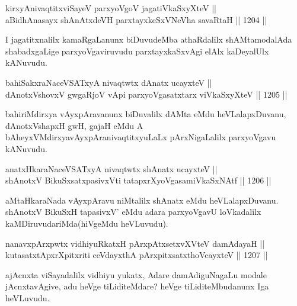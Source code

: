 \begin{shl}
kirxyAnivaqtitxviSayeV parxyoVgoV jagatiVkaSxyXteV || \\
aBidhAnasayx shAnAtxdeVH parxtayxkeSxVNeVha savaRtaH \hfill || 1204 ||  
\end{shl}

\begin{artha}
I jagatitxnalilx kamaRgaLanunx biDuvudeMba athaRdalilx shAMtamodalAda shabadxgaLige parxyoVgaviruvudu parxtayxkaSxvAgi elAlx kaDeyalUlx kANuvudu.
\end{artha}


\begin{shl}
bahiSakxraNaceVSATxyA nivaqtwtx dAnatx ucayxteV || \\
dAnotxV\s shovxV gwgaRjoV vA\s pi parxyoVgasatxtarx viVkaSxyXteV \hfill || 1205 ||  
\end{shl}

\begin{artha}
bahiriMdirxya vAyxpAravanunx biDuvalilx dAMta eMdu heVLalapxDuvanu, dAnotxV\s shapxH gwH, gajaH eMdu A bAheyxVMdirxyavAyxpAranivaqtitxyuLaLx pArxNigaLalilx parxyoVgavu kANuvudu.
\end{artha}


\begin{shl}
anatxHkaraNaceVSATxyA nivaqtwtx shAnatx ucayxteV || \\
shAnotxV BikuSxsatxpasivxVti tatapxrXyoVgasamiVkaSxNAtf \hfill || 1206 ||  
\end{shl}

\begin{artha}
aMtaHkaraNada vAyxpAravu niMtalilx shAnatx eMdu heVLalapxDuvanu. shAnotxV BikuSxH tapasivxV' eMdu adara parxyoVgavU loVkadalilx kaMDiruvudariMda(hiVgeMdu heVLuvudu).
\end{artha}


\begin{shl}
nanavxpArxpwtx vidhiyuRkatxH pArxpAtxsetxvXVteV damAdayaH || \\
kutasatxtApxrXpitxriti ceVdayxthA pArxpitxsatxthoVcayxteV \hfill || 1207 ||  
\end{shl}

\begin{artha}
ajAcnxta viSayadalilx vidhiyu yukatx, Adare damAdiguNagaLu modale jAcnxtavAgive, adu heVge tiLiditeMdare? heVge tiLiditeMbudanunx Iga heVLuvudu.
\end{artha}

